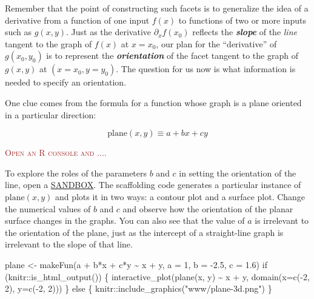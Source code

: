 \documentclass[
  letterpaper,
  DIV=11,
  numbers=noendperiod,
  oneside]{scrreprt}
\newenvironment{Shaded}{\begin{snugshade}}{\end{snugshade}}
\newcommand{\AttributeTok}[1]{\textcolor[rgb]{0.40,0.46,0.14}{#1}}
\newcommand{\ControlFlowTok}[1]{\textcolor[rgb]{0.00,0.46,0.62}{#1}}
\newcommand{\DecValTok}[1]{\textcolor[rgb]{0.68,0.00,0.00}{#1}}
\newcommand{\FloatTok}[1]{\textcolor[rgb]{0.68,0.00,0.00}{#1}}
\newcommand{\FunctionTok}[1]{\textcolor[rgb]{0.28,0.35,0.67}{#1}}
\newcommand{\NormalTok}[1]{\textcolor[rgb]{0.00,0.46,0.62}{#1}}
\newcommand{\OtherTok}[1]{\textcolor[rgb]{0.00,0.46,0.62}{#1}}
\newcommand{\SpecialCharTok}[1]{\textcolor[rgb]{0.37,0.37,0.37}{#1}}
\newcommand{\StringTok}[1]{\textcolor[rgb]{0.13,0.47,0.30}{#1}}
\newenvironment{scaffolding}%
{%
\textcolor{brown}{\hrulefill}%
  \par\vspace{.3\baselineskip}%
  \textcolor{brown}{\scshape Open an R console and ....}%
  \par\vspace{\baselineskip}%
}%
{\textcolor{brown}{\hrulefill}}
\begin{document}
Remember that the point of constructing such facets is to generalize the
idea of a derivative from a function of one input \(f(x)\) to functions
of two or more inputs such as \(g(x,y)\). Just as the derivative
\(\partial_x f(x_0)\) reflects the \textbf{\emph{slope}} of the
\emph{line} tangent to the graph of \(f(x)\) at \(x=x_0\), our plan for
the ``derivative'' of \(g(x_0,y_0)\) is to represent the
\textbf{\emph{orientation}} of the facet tangent to the graph of
\(g(x,y)\) at \((x=x_0, y=y_0)\). The question for us now is what
information is needed to specify an orientation.

One clue comes from the formula for a function whose graph is a plane
oriented in a particular direction:

\[\text{plane}(x,y) \equiv a + b x + cy\]

\begin{scaffolding}
To explore the roles of the parameters \(b\) and \(c\) in setting the
orientation of the line, open a
\href{https://maa-statprep.shinyapps.io/CalcZ-Sandbox/}{SANDBOX}. The
scaffolding code generates a particular instance of
\(\text{plane}(x,y)\) and plots it in two ways: a contour plot and a
surface plot. Change the numerical values of \(b\) and \(c\) and observe
how the orientation of the planar surface changes in the graphs. You can
also see that the value of \(a\) is irrelevant to the orientation of the
plane, just as the intercept of a straight-line graph is irrelevant to
the slope of that line.

\begin{Shaded}
\begin{Highlighting}[]
\NormalTok{plane }\OtherTok{\textless{}{-}} \FunctionTok{makeFun}\NormalTok{(a }\SpecialCharTok{+}\NormalTok{ b}\SpecialCharTok{*}\NormalTok{x }\SpecialCharTok{+}\NormalTok{ c}\SpecialCharTok{*}\NormalTok{y }\SpecialCharTok{\textasciitilde{}}\NormalTok{ x }\SpecialCharTok{+}\NormalTok{ y, }\AttributeTok{a =} \DecValTok{1}\NormalTok{, }\AttributeTok{b =} \SpecialCharTok{{-}}\FloatTok{2.5}\NormalTok{, }\AttributeTok{c =} \FloatTok{1.6}\NormalTok{)}
\ControlFlowTok{if}\NormalTok{ (knitr}\SpecialCharTok{::}\FunctionTok{is\_html\_output}\NormalTok{()) \{}
  \FunctionTok{interactive\_plot}\NormalTok{(}\FunctionTok{plane}\NormalTok{(x, y) }\SpecialCharTok{\textasciitilde{}}\NormalTok{ x }\SpecialCharTok{+}\NormalTok{ y, }\FunctionTok{domain}\NormalTok{(}\AttributeTok{x=}\FunctionTok{c}\NormalTok{(}\SpecialCharTok{{-}}\DecValTok{2}\NormalTok{, }\DecValTok{2}\NormalTok{), }\AttributeTok{y=}\FunctionTok{c}\NormalTok{(}\SpecialCharTok{{-}}\DecValTok{2}\NormalTok{, }\DecValTok{2}\NormalTok{)))}
\NormalTok{\} }\ControlFlowTok{else}\NormalTok{ \{}
\NormalTok{  knitr}\SpecialCharTok{::}\FunctionTok{include\_graphics}\NormalTok{(}\StringTok{"www/plane{-}3d.png"}\NormalTok{)}
\NormalTok{\}}
\end{Highlighting}
\end{Shaded}


\end{scaffolding}
\end{document}
